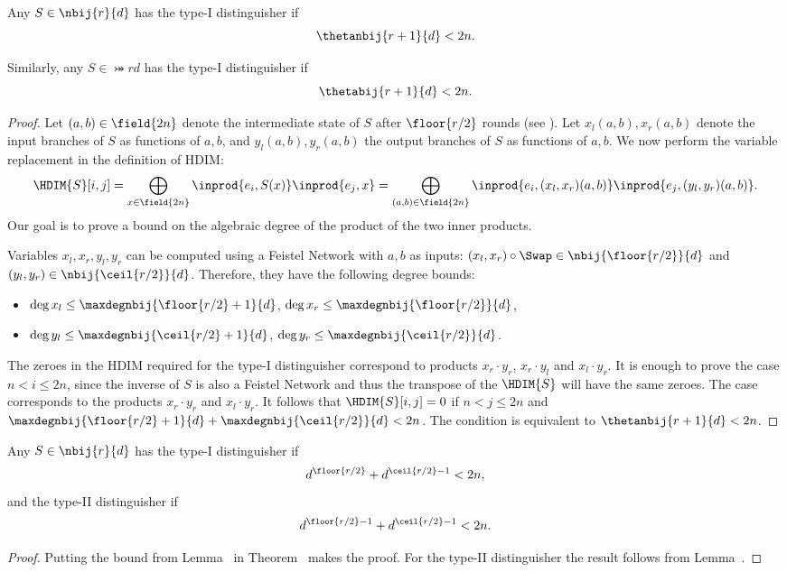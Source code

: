 \begin{theorem}
Any $S \in \nbij{r}{d}$ has the type-I distinguisher if $$\thetanbij{r+1}{d} < 2n.$$

Similarly, any $S \in \bij{r}{d}$ has the type-I distinguisher if $$\thetabij{r+1}{d} < 2n.$$
 
\end{theorem}
\begin{proof}
Let $(a,b) \in \field{2n}$ denote the intermediate state of $S$ after $\floor{r/2}$ rounds (see ). Let $x_l(a,b), x_r(a,b)$ denote the input branches of $S$ as functions of $a,b$, and $y_l(a,b),y_r(a,b)$ the output branches of $S$ as functions of $a,b$. We now perform the variable replacement in the definition of HDIM:
$$
\HDIM{S}[i,j] =
\bigoplus_{x\in \field{2n}} \inprod{e_i, S(x)} \inprod{e_j, x} =
\bigoplus_{(a,b)\in \field{2n}} \inprod{e_i, (x_l,x_r)(a,b)} \inprod{e_j, (y_l,y_r)(a,b)}.
$$
Our goal is to prove a bound on the algebraic degree of the product of the two inner products.

Variables $x_l,x_r,y_l,y_r$ can be computed using a Feistel Network with $a,b$ as inputs: $(x_l,x_r) \circ \Swap \in \nbij{\floor{r/2}}{d}$ and $(y_l,y_r) \in \nbij{\ceil{r/2}}{d}$. Therefore, they have the following degree bounds:
\begin{itemize}
    \item $\deg{x_l} \le \maxdegnbij{\floor{r/2}+1}{d}$, $\deg{x_r} \le \maxdegnbij{\floor{r/2}}{d}$,
    \item $\deg{y_l} \le \maxdegnbij{\ceil{r/2}+1}{d}$,          $\deg{y_r} \le \maxdegnbij{\ceil{r/2}}{d}$.
\end{itemize}

The zeroes in the HDIM required for the type-I distinguisher correspond to products $x_r\cdot y_r$, $x_r \cdot y_l$ and $x_l \cdot y_r$. It is enough to prove the case $n < i \le 2n$, since the inverse of $S$ is also a Feistel Network and thus the transpose of the $\HDIM{S}$ will have the same zeroes. The case corresponds to the products $x_r\cdot y_r$ and $x_l \cdot y_r$. It follows that $\HDIM{S}[i,j] = 0$ if $n < j \le 2n$ and $\maxdegnbij{\floor{r/2}+1}{d} + \maxdegnbij{\ceil{r/2}}{d} < 2n$. The condition is equivalent to $\thetanbij{r+1}{d} < 2n$.
\end{proof}


\begin{corollary}
Any $S \in \nbij{r}{d}$ has the type-I distinguisher if $$d^{\floor{r/2}} + d^{\ceil{r/2}-1} < 2n,$$
and the type-II distinguisher if 
$$d^{\floor{r/2}-1} + d^{\ceil{r/2}-1} < 2n.$$
\end{corollary}
\begin{proof}
Putting the bound from Lemma~ in Theorem~ makes the proof. For the type-II distinguisher the result follows from Lemma~.
\end{proof}

